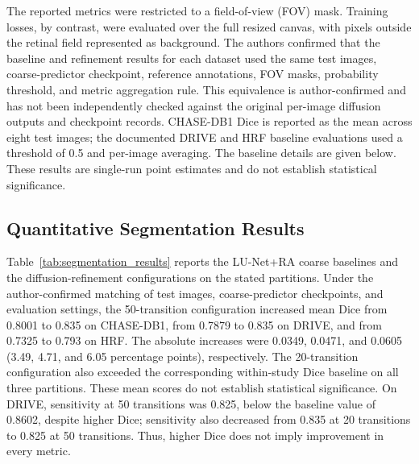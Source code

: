 \documentclass[jimaging,article,submit,pdftex,moreauthors]{Definitions/mdpi}%
\begin{document}
The reported metrics were restricted to a field-of-view (FOV) mask. Training losses, by contrast, were evaluated over the full resized canvas, with pixels outside the retinal field represented as background. The authors confirmed that the baseline and refinement results for each dataset used the same test images, coarse-predictor checkpoint, reference annotations, FOV masks, probability threshold, and metric aggregation rule. This equivalence is author-confirmed and has not been independently checked against the original per-image diffusion outputs and checkpoint records. CHASE-DB1 Dice is reported as the mean across eight test images; the documented DRIVE and HRF baseline evaluations used a threshold of 0.5 and per-image averaging. The baseline details are given below. These results are single-run point estimates and do not establish statistical significance.



\subsection{Quantitative Segmentation Results}



Table~\ref{tab:segmentation_results} reports the LU-Net+RA coarse baselines and the diffusion-refinement configurations on the stated partitions. Under the author-confirmed matching of test images, coarse-predictor checkpoints, and evaluation settings, the 50-transition configuration increased mean Dice from 0.8001 to 0.835 on CHASE-DB1, from 0.7879 to 0.835 on DRIVE, and from 0.7325 to 0.793 on HRF. The absolute increases were 0.0349, 0.0471, and 0.0605 (3.49, 4.71, and 6.05 percentage points), respectively. The 20-transition configuration also exceeded the corresponding within-study Dice baseline on all three partitions. These mean scores do not establish statistical significance. On DRIVE, sensitivity at 50 transitions was 0.825, below the baseline value of 0.8602, despite higher Dice; sensitivity also decreased from 0.835 at 20 transitions to 0.825 at 50 transitions. Thus, higher Dice does not imply improvement in every metric.
\end{document}
